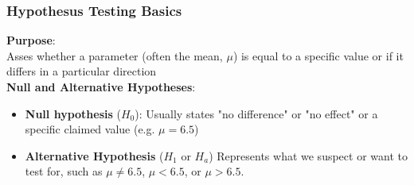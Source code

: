 \documentclass[9pt]{extarticle}
\begin{document}
\subsubsection{Hypothesus Testing Basics}
\textbf{Purpose}: \\
Asses whether a parameter (often the mean, $\mu$) is equal to a specific value or if it differs in a particular direction  \\[2ex]
\textbf{Null and Alternative Hypotheses}:
\begin{itemize}
    \item \textbf{Null hypothesis} ($H_0$): Usually states "no difference" or "no effect" or a specific claimed value (e.g. $\mu = 6.5$) 
    \item \textbf{Alternative Hypothesis} ($H_1$ or $H_a$) Represents what we suspect or want to test for, such as $\mu \neq 6.5$, $\mu < 6.5$, or $\mu > 6.5$.
\end{itemize}
\end{document}
